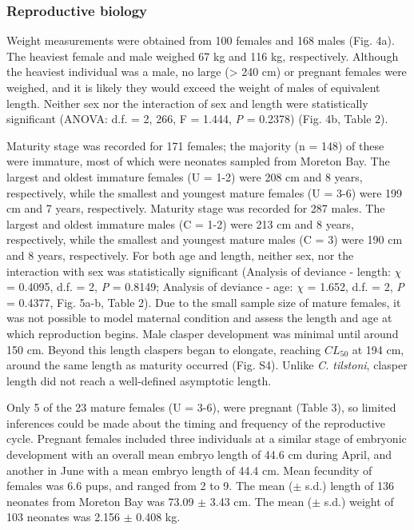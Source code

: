\documentclass[]{article}
\begin{document}
\hypertarget{reproductive-biology-1}{%
\subsubsection{Reproductive biology}\label{reproductive-biology-1}}

Weight measurements were obtained from 100 females and 168 males (Fig.
4a). The heaviest female and male weighed 67 kg and 116 kg,
respectively. Although the heaviest individual was a male, no large
(\textgreater{} 240 cm) or pregnant females were weighed, and it is
likely they would exceed the weight of males of equivalent length.
Neither sex nor the interaction of sex and length were statistically
significant (ANOVA: d.f. = 2, 266, F = 1.444, \emph{P} = 0.2378) (Fig.
4b, Table 2).

Maturity stage was recorded for 171 females; the majority (n = 148) of
these were immature, most of which were neonates sampled from Moreton
Bay. The largest and oldest immature females (U = 1-2) were 208 cm and 8
years, respectively, while the smallest and youngest mature females (U =
3-6) were 199 cm and 7 years, respectively. Maturity stage was recorded
for 287 males. The largest and oldest immature males (C = 1-2) were 213
cm and 8 years, respectively, while the smallest and youngest mature
males (C = 3) were 190 cm and 8 years, respectively. For both age and
length, neither sex, nor the interaction with sex was statistically
significant (Analysis of deviance - length: \(\chi\) = 0.4095, d.f. = 2,
\emph{P} = 0.8149; Analysis of deviance - age: \(\chi\) = 1.652, d.f. =
2, \emph{P} = 0.4377, Fig. 5a-b, Table 2). Due to the small sample size
of mature females, it was not possible to model maternal condition and
assess the length and age at which reproduction begins. Male clasper
development was minimal until around 150 cm. Beyond this length claspers
began to elongate, reaching \(CL_{50}\) at 194 cm, around the same
length as maturity occurred (Fig. S4). Unlike \emph{C. tilstoni},
clasper length did not reach a well-defined asymptotic length.

Only 5 of the 23 mature females (U = 3-6), were pregnant (Table 3), so
limited inferences could be made about the timing and frequency of the
reproductive cycle. Pregnant females included three individuals at a
similar stage of embryonic development with an overall mean embryo
length of 44.6 cm during April, and another in June with a mean embryo
length of 44.4 cm. Mean fecundity of females was 6.6 pups, and ranged
from 2 to 9. The mean (\(\pm\) s.d.) length of 136 neonates from Moreton
Bay was 73.09 \(\pm\) 3.43 cm. The mean (\(\pm\) s.d.) weight of 103
neonates was 2.156 \(\pm\) 0.408 kg.
\end{document}
